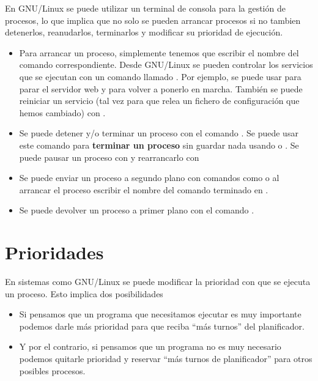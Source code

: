 \documentclass[a4paper,12pt,spanish]{sphinxmanual}
\begin{document}
En GNU/Linux se puede utilizar un terminal de consola para la gestión de procesos, lo que implica que no solo se pueden arrancar procesos si no tambien detenerlos, reanudarlos, terminarlos y modificar su prioridad de ejecución.
\begin{itemize}
\item {} 
Para arrancar un proceso, simplemente tenemos que escribir el nombre del comando correspondiente. Desde GNU/Linux se pueden controlar los servicios que se ejecutan con un comando llamado . Por ejemplo, se puede usar  para parar el servidor web y  para volver a ponerlo en marcha. También se puede reiniciar un servicio (tal vez para que relea un fichero de configuración que hemos cambiado) con .

\item {} 
Se puede detener y/o terminar un proceso con el comando . Se puede usar este comando para \textbf{terminar un proceso} sin guardar nada usando  o . Se puede pausar un proceso con  y rearrancarlo con 

\item {} 
Se puede enviar un proceso a segundo plano con comandos como  o al arrancar el proceso escribir el nombre del comando terminado en \sphinxcode{\&}.

\item {} 
Se puede devolver un proceso a primer plano con el comando .

\end{itemize}


\section{Prioridades}
\label{textos/tema1:prioridades}
En sistemas como GNU/Linux se puede modificar la prioridad con que se ejecuta un proceso. Esto implica dos posibilidades
\begin{itemize}
\item {} 
Si pensamos que un programa que necesitamos ejecutar es muy importante podemos darle más prioridad para que reciba ``más turnos'' del planificador.

\item {} 
Y por el contrario, si pensamos que un programa no es muy necesario podemos quitarle prioridad y reservar ``más turnos de planificador'' para otros posibles procesos.

\end{itemize}
\end{document}
